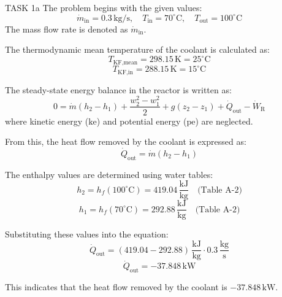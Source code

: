 TASK 1a  
The problem begins with the given values:  
\[
\dot{m}_{\text{in}} = 0.3 \, \text{kg/s}, \quad T_{\text{in}} = 70^\circ\text{C}, \quad T_{\text{out}} = 100^\circ\text{C}
\]  
The mass flow rate is denoted as \( \dot{m}_{\text{in}} \).  

The thermodynamic mean temperature of the coolant is calculated as:  
\[
T_{\text{KF,mean}} = 298.15 \, \text{K} = 25^\circ\text{C}
\]  
\[
T_{\text{KF,in}} = 288.15 \, \text{K} = 15^\circ\text{C}
\]  

The steady-state energy balance in the reactor is written as:  
\[
0 = \dot{m} (h_2 - h_1) + \frac{w_2^2 - w_1^2}{2} + g(z_2 - z_1) + \dot{Q}_{\text{out}} - \dot{W}_{\text{R}}
\]  
where kinetic energy (\( \text{ke} \)) and potential energy (\( \text{pe} \)) are neglected.  

From this, the heat flow removed by the coolant is expressed as:  
\[
\dot{Q}_{\text{out}} = \dot{m} (h_2 - h_1)
\]  

The enthalpy values are determined using water tables:  
\[
h_2 = h_f(100^\circ\text{C}) = 419.04 \, \frac{\text{kJ}}{\text{kg}} \quad \text{(Table A-2)}
\]  
\[
h_1 = h_f(70^\circ\text{C}) = 292.88 \, \frac{\text{kJ}}{\text{kg}} \quad \text{(Table A-2)}
\]  

Substituting these values into the equation:  
\[
\dot{Q}_{\text{out}} = (\text{419.04} - \text{292.88}) \, \frac{\text{kJ}}{\text{kg}} \cdot 0.3 \, \frac{\text{kg}}{\text{s}}
\]  
\[
\dot{Q}_{\text{out}} = -37.848 \, \text{kW}
\]  

This indicates that the heat flow removed by the coolant is \( -37.848 \, \text{kW} \).